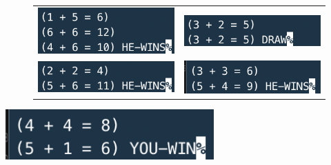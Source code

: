 \documentclass[a4paper,14pt]{extreport} %
\begin{document}
\begin{enumerate}
\begin{figure}[ht]\center
	\begin{tabular}{cc}
		\includegraphics[width=80mm]{1} & \includegraphics[width=80mm]{2} \\
		\includegraphics[width=80mm]{3} & \includegraphics[width=80mm]{4}
	\end{tabular}
\end{figure}

\includegraphics[width=80mm]{5}

\end{enumerate}
\end{document}
